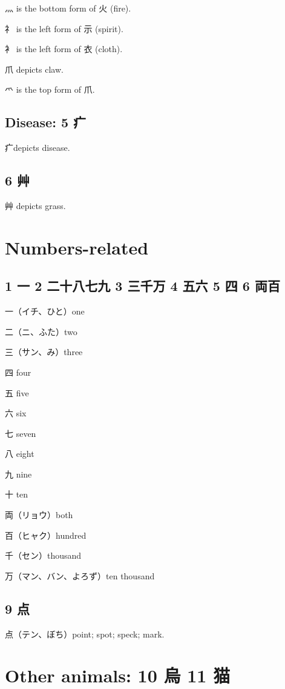 灬 is the bottom form of 火 (fire).

礻 is the left form of 示 (spirit).

衤 is the left form of 衣 (cloth).

爪 depicts claw.

爫 is the top form of 爪.

\subsection{Disease: 5 疒}

疒depicts disease.

\subsection{6 艸}

艸 depicts grass.

\section{Numbers-related}

\subsection{1 一 2 二十八七九 3 三千万 4 五六 5 四 6 両百}

一（イチ、ひと）one

二（ニ、ふた）two

三（サン、み）three

四 four

五 five

六 six

七 seven

八 eight

九 nine

十 ten

両（リョウ）both

百（ヒャク）hundred

千（セン）thousand

万（マン、バン、よろず）ten thousand

\subsection{9 点}

点（テン、ぼち）point; spot; speck; mark.



\section{Other animals: 10 烏 11 猫}

